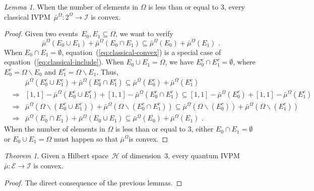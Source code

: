 \documentclass{article}
\theoremstyle{remark}
\newtheorem{thm}{Theorem}
\newtheorem{lemma}{Lemma}
\newcommand{\Hilb}{\mathcal{H}}
\newcommand{\events}{\ensuremath{\mathcal{E}}}
\begin{document}
\begin{lemma}When the number of elements in $\Omega$ is less than
or equal to 3, every classical IVPM~$\bar{\mu}^{\Omega}:2^{\Omega}\rightarrow\mathscr{I}$
is convex.\end{lemma}
\begin{proof}
Given two events~$E_{0},E_{1}\subseteq\Omega$, we want to verify
\begin{equation}
\bar{\mu}^{\Omega}\left(E_{0}\cup E_{1}\right)+\bar{\mu}^{\Omega}\left(E_{0}\cap E_{1}\right)\subseteq\bar{\mu}^{\Omega}\left(E_{0}\right)+\bar{\mu}^{\Omega}\left(E_{1}\right)\textrm{ .}\label{eq:classical-convex}
\end{equation}
When $E_{0}\cap E_{1}=\emptyset$, equation~(\ref{eq:classical-convex})
is a special case of equation~(\ref{eq:classical-include}). When
$E_{0}\cup E_{1}=\Omega$, we have $E_{0}^{c}\cap E_{1}^{c}=\emptyset$,
where $E_{0}^{c}=\Omega\backslash E_{0}$ and $E_{1}^{c}=\Omega\backslash E_{1}$.
Thus, 
\begin{eqnarray*}
 &  & \bar{\mu}^{\Omega}\left(E_{0}^{c}\cup E_{1}^{c}\right)+\bar{\mu}^{\Omega}\left(E_{0}^{c}\cap E_{1}^{c}\right)\subseteq\bar{\mu}^{\Omega}\left(E_{0}^{c}\right)+\bar{\mu}^{\Omega}\left(E_{1}^{c}\right)\\
 & \Rightarrow & \left[1,1\right]-\bar{\mu}^{\Omega}\left(E_{0}^{c}\cup E_{1}^{c}\right)+\left[1,1\right]-\bar{\mu}^{\Omega}\left(E_{0}^{c}\cap E_{1}^{c}\right)\subseteq\left[1,1\right]-\bar{\mu}^{\Omega}\left(E_{0}^{c}\right)+\left[1,1\right]-\bar{\mu}^{\Omega}\left(E_{1}^{c}\right)\\
 & \Rightarrow & \bar{\mu}^{\Omega}\left(\Omega\backslash\left(E_{0}^{c}\cup E_{1}^{c}\right)\right)+\bar{\mu}^{\Omega}\left(\Omega\backslash\left(E_{0}^{c}\cap E_{1}^{c}\right)\right)\subseteq\bar{\mu}^{\Omega}\left(\Omega\backslash\left(E_{0}^{c}\right)\right)+\bar{\mu}^{\Omega}\left(\Omega\backslash\left(E_{1}^{c}\right)\right)\\
 & \Rightarrow & \bar{\mu}^{\Omega}\left(E_{0}\cap E_{1}\right)+\bar{\mu}^{\Omega}\left(E_{0}\cup E_{1}\right)\subseteq\bar{\mu}^{\Omega}\left(E_{0}\right)+\bar{\mu}^{\Omega}\left(E_{1}\right)\textrm{ .}
\end{eqnarray*}
When the number of elements in $\Omega$ is less than or equal to
3, either $E_{0}\cap E_{1}=\emptyset$ or $E_{0}\cup E_{1}=\Omega$
must happen so that $\bar{\mu}^{\Omega}$is convex.
\end{proof}
\begin{thm}Given a Hilbert space~$\Hilb$ of dimension~$3$, every
quantum IVPM~$\bar{\mu}:\events\rightarrow\mathscr{I}$ is convex.\end{thm}
\begin{proof}
The direct consequence of the previous lemmas.
\end{proof}
\end{document}
